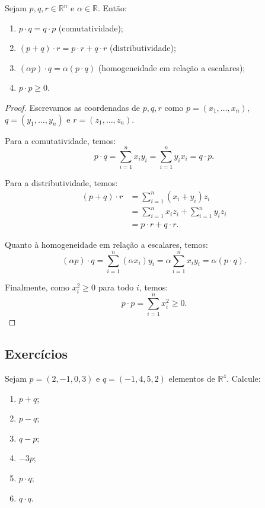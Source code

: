 \begin{proposition}
    Sejam $p, q, r \in \mathbb R^n$ e $\alpha \in \mathbb R$. Então:
    \begin{enumerate}
        \item $p \cdot q = q \cdot p$ (comutatividade);
        \item $(p+q) \cdot r = p \cdot r + q \cdot r$ (distributividade);
        \item $(\alpha p) \cdot q = \alpha(p \cdot q)$ (homogeneidade em relação a escalares);
        \item $p \cdot p \geq 0$.
    \end{enumerate}
\end{proposition}

\begin{proof}
    Escrevamos as coordenadas de $p, q, r$ como $p=(x_1, \ldots, x_n)$, $q=(y_1, \ldots, y_n)$ e $r=(z_1, \ldots, z_n)$.

    Para a comutatividade, temos:
    \begin{equation*}
        p \cdot q = \sum_{i=1}^n x_iy_i = \sum_{i=1}^n y_ix_i = q \cdot p.
    \end{equation*}

    Para a distributividade, temos:
    \begin{align*}
        (p+q) \cdot r &= \sum_{i=1}^n (x_i+y_i)z_i \\
        &= \sum_{i=1}^n x_iz_i + \sum_{i=1}^n y_iz_i \\
        &= p \cdot r + q \cdot r.
    \end{align*}

    Quanto à homogeneidade em relação a escalares, temos:
    \begin{equation*}
        (\alpha p) \cdot q = \sum_{i=1}^n (\alpha x_i)y_i = \alpha \sum_{i=1}^n x_iy_i = \alpha (p \cdot q).
    \end{equation*}

    Finalmente, como $x_i^2\geq 0$ para todo $i$, temos:
    \begin{equation*}
        p \cdot p = \sum_{i=1}^n x_i^2 \geq 0.
    \end{equation*}
\end{proof}

\subsection*{Exercícios}

\begin{exercise}
    Sejam $p=(2,-1,0,3)$ e $q=(-1,4,5,2)$ elementos de $\mathbb R^4$.
    Calcule:
    \begin{enumerate}[label=(\alph*)]
        \item $p+q$;
        \item $p-q$;
        \item $q-p$;
        \item $-3p$;
        \item $p\cdot q$;
        \item $q\cdot q$.
    \end{enumerate}
\end{exercise}

